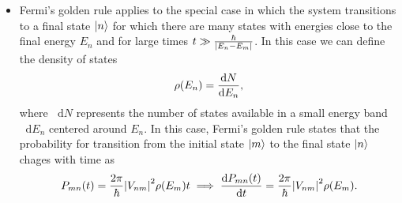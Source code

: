 \documentclass[11pt, a4paper]{article}
\newcommand{\diff}{\mathop{}\!\mathrm{d}} %
\begin{document}
\begin{itemize}
    \item Fermi's golden rule applies to the special case in which the system transitions to a final state $ \ket{n} $ for which there are many states with energies close to the final energy $ E_{n} $ and for large times $ t \gg \frac{\hbar}{\abs{E_{n} - E_{m}}} $. In this case we can define the density of states
    \begin{equation*}
        \rho(E_{n}) = \dv{N}{E_{n}},
    \end{equation*}
    where $ \diff N $ represents the number of states available in a small energy band $ \diff E_{n} $ centered around $ E_{n} $. In this case, Fermi's golden rule states that the probability for transition from the initial state $ \ket{m} $ to the final state $ \ket{n} $ chages with time as
    \begin{equation*}
        P_{mn}(t) = \frac{2\pi}{\hbar} \abs{V_{nm}}^{2}\rho(E_{m})t \implies \dv{P_{mn}(t)}{t} = \frac{2\pi}{\hbar} \abs{V_{nm}}^{2}\rho(E_{m}).
    \end{equation*}

\end{itemize}
\end{document}
